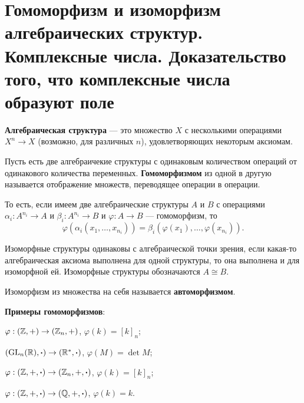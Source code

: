 \section{Гомоморфизм и изоморфизм алгебраических структур. Комплексные числа. Доказательство того, что комплексные числа образуют поле}

\begin{definition}
    \textbf{Алгебраическая структура} --- это множество $X$ с несколькими операциями $X^n \rightarrow X$ (возможно, для различных $n$), удовлетворяющих некоторым аксиомам.
\end{definition}

\begin{definition}
    Пусть есть две алгебраичекие структуры с одинаковым количеством операций от одинакового количества переменных. \textbf{Гомоморфизмом} из одной в другую называется отображение множеств, переводящее операции в операции.

    То есть, если имеем две алгебраические структуры $A$ и $B$ с операциями $\alpha_i: A^{n_i} \rightarrow A$ и $\beta_i: A^{n_i} \rightarrow B$ и $\varphi: A \rightarrow B$ --- гомоморфизм, то
    $$
    \varphi(\alpha_i(x_1, \ldots, x_{n_i})) = \beta_i(\varphi(x_1), \ldots, \varphi(x_{n_i})).
    $$

    Изоморфные структуры одинаковы с алгебраической точки зрения, если какая-то алгебраическая аксиома выполнена для одной структуры, то она выполнена и для изоморфной ей. Изоморфные структуры обозначаются $A \cong B$.

    Изоморфизм из множества на себя называется \textbf{автоморфизмом}.
\end{definition}

\textbf{Примеры гомоморфизмов}:
\begin{enumerate}
        \begin{minipage}{.5\textwidth}
        \item $\varphi: (\mathbb{Z}, +) \rightarrow (\mathbb{Z}_n, +)$, $\varphi(k) = [k]_n$;
        \item $(\mathrm{GL}_n(\mathbb{R}), \boldsymbol{\cdot}) \rightarrow (\mathbb{R}^\ast, \boldsymbol{\cdot})$, $\varphi(M) = \det M$;
        \end{minipage}
        \begin{minipage}{.5\textwidth}
        \item $\varphi: (\mathbb{Z}, +, \boldsymbol{\cdot}) \rightarrow (\mathbb{Z}_n, +, \boldsymbol{\cdot})$, $\varphi(k) = [k]_n$;
        \item $\varphi: (\mathbb{Z}, +, \boldsymbol{\cdot}) \rightarrow (\mathbb{Q}, +, \boldsymbol{\cdot})$, $\varphi(k) = k$.
        \end{minipage}
\end{enumerate}

